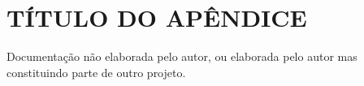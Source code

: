 \section{TÍTULO DO APÊNDICE}

Documentação não elaborada pelo autor, ou elaborada pelo autor mas constituindo parte de outro projeto.